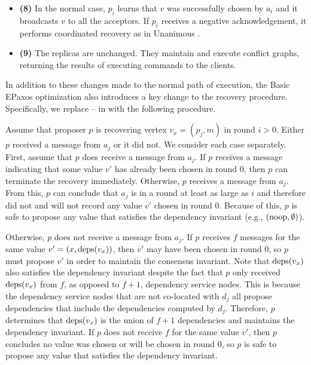 \begin{itemize}
  \item \textbf{(8)}
    In the normal case, $p_i$ learns that $v$ was successfully chosen by $a_i$
    and it broadcasts $v$ to all the acceptors. If $p_i$ receives a negative
    acknowledgement, it performs coordinated recovery as in Unanimous
    \BPaxos{}.

  \item \textbf{(9)}
    The replicas are unchanged. They maintain and execute conflict graphs,
    returning the results of executing commands to the clients.
\end{itemize}

In addition to these changes made to the normal path of execution, the Basic
EPaxos optimization also introduces a key change to the recovery procedure.
Specifically, we replace  -- 
in  with the following procedure.

Assume that proposer $p$ is recovering vertex $v_x = (p_j, m)$ in round $i >
0$. Either $p$ received a message from $a_j$ or it did not. We consider each
case separately.
%
First, assume that $p$ does receive a message from $a_j$. If $p$ receives a
message indicating that some value $v'$ has already been chosen in round $0$,
then $p$ can terminate the recovery immediately. Otherwise, $p$ receives a
 message from $a_j$. From this, $p$ can conclude that $a_j$ is
in a round at least as large as $i$ and therefore did not and will not record
any value $v'$ chosen in round $0$. Because of this, $p$ is safe to propose any
value that satisfies the dependency invariant (e.g., $(\text{noop}, \emptyset{})$).

Otherwise, $p$ does not receive a message from $a_j$. If $p$ receives $f$
 messages for the same value $v' = (x, \text{deps}(v_x))$,
then $v'$ may have been chosen in round $0$, so $p$ must propose $v'$ in order
to maintain the consensus invariant. Note that $\text{deps}(v_x)$ also satisfies the
dependency invariant despite the fact that $p$ only received $\text{deps}(v_x)$ from
$f$, as opposed to $f+1$, dependency service nodes. This is because the
dependency service nodes that are not co-located with $d_j$ all propose
dependencies that include the dependencies computed by $d_j$. Therefore, $p$
determines that $\text{deps}(v_x)$ is the union of $f+1$ dependencies and maintains
the dependency invariant.
%
If $p$ does not receive $f$  for the same value $v'$,
then $p$ concludes no value was chosen or will be chosen in round $0$,  so $p$
is safe to propose any value that satisfies the dependency invariant.

